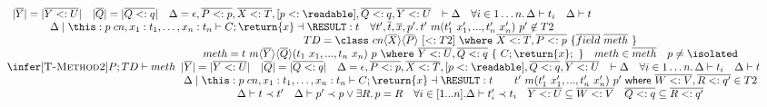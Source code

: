 {\[\begin{array}{c}
\begin{array}{l}
{\begin{array}{c}
  { |\overline{Y}|=|\overline{Y<:U}| }
\quad
  { |\overline{Q}|=|\overline{Q<:q}| }
\quad
  {\Delta=\epsilon,\overline{P<:p},\overline{X<:T},[p<:\readable],\overline{Q<:q},\overline{Y<:U}}
\quad
  {\vdash \Delta}
\quad
  {\forall i\in 1\ldots n \ldotp \Delta\vdash t_i}
\quad
  {\Delta \vdash t}
\\
  {\Delta\mid\this:p\;cn,x_1:t_1,\ldots,x_n:t_n \vdash C;\return{x} \dashv \RESULT:t}
\quad
  {\forall t', \overline{t},\overline{x},p'\ldotp  t'\ m(t_1'\ x_1',...,t_n'\ x_n')\ p' \not\in T2}
\end{array}
}
\\[0.5em]
\infer[\textsc{T-Method2}]{ %
  P;TD\vdash meth
}{
  \begin{array}{c}
  {TD = \class\ cn\langle\overline{X}\rangle\langle\overline{P}\rangle\ [ <: T2 ]\ \where\ \overline{X<:T}, \overline{P<:p}\ \{ \overline{field}\ \overline{meth}\ \}}
\\
  {meth = t\ m\langle\overline{Y}\rangle\langle\overline{Q}\rangle(t_1\ x_1,...,t_n\ x_n)\ p\ \where\ \overline{Y<:U}, \overline{Q<:q}\ \{\ C;\return{x};\ \}}
\quad
  {meth\in\overline{meth}}
\quad
  {p \neq \isolated}
\\
  { |\overline{Y}|=|\overline{Y<:U}| }
\quad
  { |\overline{Q}|=|\overline{Q<:q}| }
\quad
  {\Delta=\epsilon,\overline{P<:p},\overline{X<:T},[p<:\readable],\overline{Q<:q},\overline{Y<:U}}
\quad
  {\vdash \Delta}
\quad
  {\forall i\in 1\ldots n \ldotp \Delta\vdash t_i}
\quad
  {\Delta \vdash t}
\\
  {\Delta\mid\this:p\;cn,x_1:t_1,\ldots,x_n:t_n \vdash C;\return{x} \dashv \RESULT:t}
\qquad
  {t'\ m(t_1'\ x_1',...,t_n'\ x_n')\ p'\ \textsf{where}\ \overline{W<:V},\overline{R<:q'}\in T2}
\\
  {\Delta\vdash t \prec t'}
\quad
  {\Delta\vdash p' \prec p \lor \exists R\ldotp p=R}
\quad
  {\forall i\in[1...n]. \Delta\vdash t_i' \prec t_i}
\quad
  {\overline{Y<:U}\subseteq\overline{W<:V}}
\quad
  {\overline{Q<:q}\subseteq\overline{R<:q'}}
\end{array}
}
\end{array}
\end{array}
\]
}
